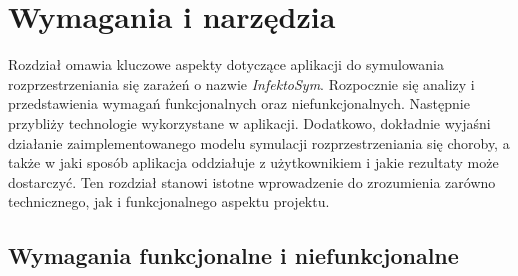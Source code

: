 \chapter{Wymagania i narzędzia}
\label{ch:wymagania-i-narzedzia}
Rozdział omawia kluczowe aspekty dotyczące aplikacji do symulowania rozprzestrzeniania się zarażeń o nazwie \textit{InfektoSym}. Rozpocznie się analizy i przedstawienia wymagań funkcjonalnych oraz niefunkcjonalnych. Następnie przybliży technologie wykorzystane w aplikacji. Dodatkowo, dokładnie wyjaśni działanie zaimplementowanego modelu symulacji rozprzestrzeniania się choroby, a także w jaki sposób aplikacja oddziałuje z użytkownikiem i jakie rezultaty może dostarczyć. Ten rozdział stanowi istotne wprowadzenie do zrozumienia zarówno technicznego, jak i funkcjonalnego aspektu projektu.

\section{\textbf{Wymagania funkcjonalne i niefunkcjonalne}}
